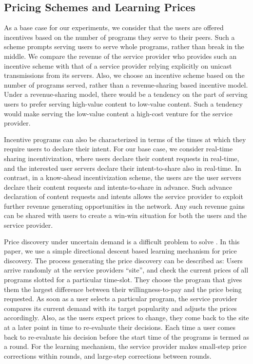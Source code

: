 \documentclass[conference,a4paper]{IEEEtran}
\begin{document}
\subsection{Pricing Schemes and Learning Prices}
\label{sec:pric-schem-learn}
As a base case for our experiments, we consider that the users are offered incentives based on the number of programs they serve to their peers. Such a scheme prompts serving users to serve whole programs, rather than break in the middle. We compare the revenue of the service provider who provides such an incentive scheme with that of a service provider relying explicitly on unicast transmissions from its servers. Also, we choose an incentive scheme based on the number of programs served, rather than a revenue-sharing based incentive model.  Under a revenue-sharing model, there would be a tendency on the part of serving users to prefer serving high-value content to low-value content. Such a tendency would make serving the low-value content a high-cost venture for the service provider.

Incentive programs can also be characterized in terms of the times at which they require users to declare their intent. For our base case, we consider real-time sharing incentivization, where users declare their content requests in real-time, and the interested user servers declare their intent-to-share also in real-time. In contrast, in a know-ahead incentivization scheme, the users are the user servers declare their content requests and intents-to-share in advance. Such advance declaration of content requests and intents allows the service provider to exploit further revenue generating opportunities in the network. Any such revenue gains can be shared with users to create a win-win situation for both the users and the service provider. 

Price discovery under uncertain demand is a difficult problem to solve
\cite{Phillips2005, Talluri2004}. In this paper, we use a simple directional descent based learning mechanism for price discovery. The process generating the price discovery can be described as: Users arrive randomly at the service providers ``site'', and check the current prices of all programs slotted for a particular time-slot. They choose the program that gives them the largest difference between their willingness-to-pay and the price being requested. As soon as a user selects a particular program, the service provider compares its current demand with its target popularity and adjusts the prices accordingly. Also, as the users expect prices to change, they come back to the site at a later point in time to re-evaluate their decisions. Each time a user comes back to re-evaluate his decision before the start time of the programs is termed as a round. For the learning mechanism, the service provider makes small-step price corrections within rounds, and large-step corrections between rounds. 
\end{document}

